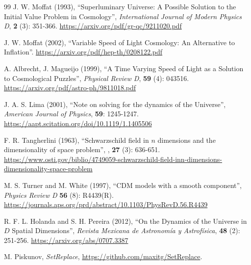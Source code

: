\documentclass{article}
\begin{document}
\begin{thebibliography}{99}
J. W. Moffat (1993), ``Superluminary Universe: A Possible Solution to the Initial Value Problem in Cosmology'', \textit{International Journal of Modern Physics D}, \textbf{2} (3): 351-366. \url{https://arxiv.org/pdf/gr-qc/9211020.pdf}

J. W. Moffat (2002), ``Variable Speed of Light Cosmology: An Alternative to Inflation''. \url{https://arxiv.org/pdf/hep-th/0208122.pdf}

A. Albrecht, J. Magueijo (1999), ``A Time Varying Speed of Light as a Solution to Cosmological Puzzles'', \textit{Physical Review D}, \textbf{59} (4): 043516. \url{https://arxiv.org/pdf/astro-ph/9811018.pdf}

J. A. S. Lima (2001), ``Note on solving for the dynamics of the Universe'', \textit{American Journal of Physics}, \textbf{59}: 1245-1247. \url{https://aapt.scitation.org/doi/10.1119/1.1405506}

F. R. Tangherlini (1963), ``Schwarzschild field in $n$ dimensions and the dimensionality of space problem'', , \textbf{27} (3): 636-651. \url{https://www.osti.gov/biblio/4749059-schwarzschild-field-inn-dimensions-dimensionality-space-problem}

M. S. Turner and M. White (1997), ``CDM models with a smooth component'', \textit{Physics Review D} \textbf{56} (8): R4439(R). \url{https://journals.aps.org/prd/abstract/10.1103/PhysRevD.56.R4439}

R. F. L. Holanda and S. H. Pereira (2012), ``On the Dynamics of the Universe in $D$ Spatial Dimensions'', \textit{Revista Mexicana de Astronom\'ia y Astrof\'isica}, \textbf{48} (2): 251-256. \url{https://arxiv.org/abs/0707.3387}

M. Piskunov, \textit{SetReplace}, \url{https://github.com/maxitg/SetReplace}.
\end{thebibliography}
\end{document}
